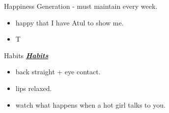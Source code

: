 \begin{multicols}{4}
\begin{columns}
\begin{column}{0.22\columnwidth}
\begin{block}{Happiness Generation - must maintain every week.}
\begin{itemize}
          \tiny \item \tiny happy that I have Atul to show me.
          \item \tiny T
            \end{itemize}
\ifdefined\POSTER
      \end{block}
\fi

\ifdefined\POSTER
    \begin{block}{Habits}
\else
 \underline{\bf \it Habits}
\fi
      \begin{itemize}
        \tiny \item \tiny back straight + eye contact.
      \item \tiny lips relaxed.
      \item \tiny watch what happens when a hot girl talks to you.
      \end{itemize}
\ifdefined\POSTER
    \end{block}
  \end{column} %
\fi

\ifdefined\POSTER
\fi


\end{columns}
\end{multicols}
